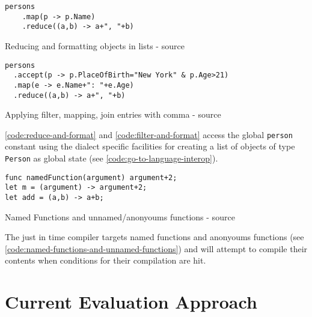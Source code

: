 \begin{listing}[H]
    \begin{verbatim}
persons
    .map(p -> p.Name)
    .reduce((a,b) -> a+", "+b)
    \end{verbatim}
    \caption{Reducing and formatting objects in lists - source \cite{parser2_xnacly}}
    \label{code:reduce-and-format}
\end{listing}

\begin{listing}[H]
    \begin{verbatim}
persons
  .accept(p -> p.PlaceOfBirth="New York" & p.Age>21)
  .map(e -> e.Name+": "+e.Age)
  .reduce((a,b) -> a+", "+b)
    \end{verbatim}
    \caption{Applying filter, mapping, join entries with comma - source \cite{parser2_xnacly}}
    \label{code:filter-and-format}
\end{listing}


\autoref{code:reduce-and-format} and \autoref{code:filter-and-format} access
the global \texttt{person} constant using the dialect specific facilities for
creating a list of objects of type \texttt{Person} as global state (see
\autoref{code:go-to-language-interop}).

\begin{listing}[H]
    \begin{verbatim}
func namedFunction(argument) argument+2;
let m = (argument) -> argument+2;
let add = (a,b) -> a+b;
    \end{verbatim}
    \caption{Named Functions and unnamed/anonyoums functions - source \cite{parser2_xnacly}}
    \label{code:named-functions-and-unnamed-functions}
\end{listing}


The just in time compiler targets named functions and anonyoums functions (see
\autoref{code:named-functions-and-unnamed-functions}) and will attempt to
compile their contents when conditions for their compilation are hit.


\section{Current Evaluation Approach}


